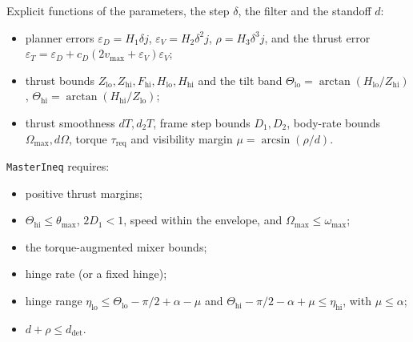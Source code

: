 \begin{definition}
\label{def:budget}
\leanok
{}
Explicit functions of the parameters, the step $\delta$, the filter and the standoff $d$:
\begin{itemize}
  \item planner errors $\varepsilon_D=H_1\delta j$, $\varepsilon_V=H_2\delta^2j$,
        $\rho=H_3\delta^3j$, and the thrust error
        $\varepsilon_T=\varepsilon_D+c_D(2v_{\max}+\varepsilon_V)\varepsilon_V$;
  \item thrust bounds $Z_{\mathrm{lo}},Z_{\mathrm{hi}},F_{\mathrm{hi}},H_{\mathrm{lo}},H_{\mathrm{hi}}$
        and the tilt band $\Theta_{\mathrm{lo}}=\arctan(H_{\mathrm{lo}}/Z_{\mathrm{hi}})$,
        $\Theta_{\mathrm{hi}}=\arctan(H_{\mathrm{hi}}/Z_{\mathrm{lo}})$;
  \item thrust smoothness $dT,d_2T$, frame step bounds $D_1,D_2$, body-rate bounds
        $\Omega_{\max},d\Omega$, torque $\tau_{\mathrm{req}}$ and visibility margin
        $\mu=\arcsin(\rho/d)$.
\end{itemize}
\texttt{MasterIneq} requires:
\begin{itemize}
  \item positive thrust margins;
  \item $\Theta_{\mathrm{hi}}\le\theta_{\max}$, $2D_1<1$, speed within the envelope, and
        $\Omega_{\max}\le\omega_{\max}$;
  \item the torque-augmented mixer bounds;
  \item hinge rate (or a fixed hinge);
  \item hinge range
        $\eta_{\mathrm{lo}}\le\Theta_{\mathrm{lo}}-\pi/2+\alpha-\mu$ and
        $\Theta_{\mathrm{hi}}-\pi/2-\alpha+\mu\le\eta_{\mathrm{hi}}$, with $\mu\le\alpha$;
  \item $d+\rho\le d_{\mathrm{det}}$.
\end{itemize}
\end{definition}

